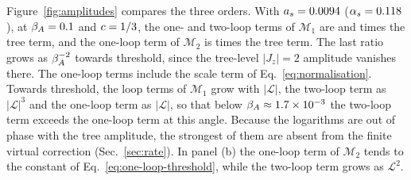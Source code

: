 Figure~\ref{fig:amplitudes} compares the three orders. With $a_s=0.0094$ ($\alpha_s=0.118$), at $\beta_A=0.1$ and $c=1/3$, the one- and two-loop terms of $\mathcal M_1$ are \MoneOneLoopRatio{} and \MoneTwoLoopRatio{} times the tree term, and the one-loop term of $\mathcal M_2$ is \MtwoOneLoopRatio{} times the tree term. The last ratio grows as $\beta_A^{-2}$ towards threshold, since the tree-level $|J_z|=2$ amplitude vanishes there. The one-loop terms include the scale term of Eq.~\eqref{eq:normalisation}. Towards threshold, the loop terms of $\mathcal M_1$ grow with $|\mathcal L|$, the two-loop term as $|\mathcal L|^3$ and the one-loop term as $|\mathcal L|$, so that below $\beta_A\approx1.7\times10^{-3}$ the two-loop term exceeds the one-loop term at this angle. Because the logarithms are out of phase with the tree amplitude, the strongest of them are absent from the finite virtual correction (Sec.~\ref{sec:rate}). In panel (b) the one-loop term of $\mathcal M_2$ tends to the constant of Eq.~\eqref{eq:one-loop-threshold}, while the two-loop term grows as $\mathcal L^2$.
